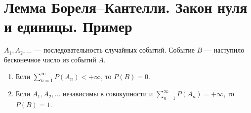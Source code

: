 \section{Лемма Бореля–Кантелли. Закон нуля и единицы. Пример}

\begin{lemma}\label{lem:borkan}
    $A_1, A_2, \ldots$ --- последовательность случайных событий. Событие $B$ --- наступило бесконечное число из событий $A$.
     \begin{enumerate}
         \item  Если $\sum_{n = 1}^\infty P(A_n) < +\infty$, то $P(B) = 0$.
         \item Если $A_1, A_2, \ldots$ независимы в совокупности и $\sum_{n = 1}^\infty P(A_n) = +\infty$, то
    $P(B) = 1$.
     \end{enumerate}

\end{lemma}

